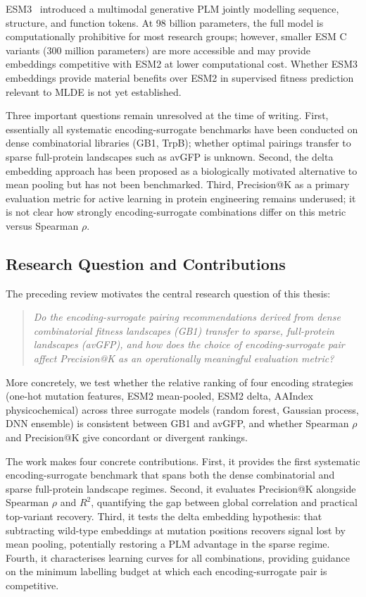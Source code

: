 \documentclass[english, 12pt, a4paper, elec, utf8, a-2b, online]{aaltothesis}
\begin{document}
ESM3~\cite{Hayes2025ESM3} introduced a multimodal generative PLM jointly modelling sequence,
structure, and function tokens.
At 98 billion parameters, the full model is computationally prohibitive for most research
groups; however, smaller ESM C variants (300 million parameters) are more accessible and may
provide embeddings competitive with ESM2 at lower computational cost.
Whether ESM3 embeddings provide material benefits over ESM2 in supervised fitness prediction
relevant to MLDE is not yet established.

Three important questions remain unresolved at the time of writing.
First, essentially all systematic encoding-surrogate benchmarks have been conducted on dense
combinatorial libraries (GB1, TrpB); whether optimal pairings transfer to sparse full-protein
landscapes such as avGFP is unknown.
Second, the delta embedding approach has been proposed as a biologically motivated alternative
to mean pooling but has not been benchmarked.
Third, Precision@K as a primary evaluation metric for active learning in protein engineering
remains underused; it is not clear how strongly encoding-surrogate combinations differ on
this metric versus Spearman $\rho$.

\subsection{Research Question and Contributions}
\label{sec:litrev:rq}

The preceding review motivates the central research question of this thesis:

\begin{quote}
  \emph{Do the encoding-surrogate pairing recommendations derived from dense combinatorial
  fitness landscapes (GB1) transfer to sparse, full-protein landscapes (avGFP),
  and how does the choice of encoding-surrogate pair affect Precision@K as an
  operationally meaningful evaluation metric?}
\end{quote}

More concretely, we test whether the relative ranking of four encoding strategies
(one-hot mutation features, ESM2 mean-pooled, ESM2 delta, AAIndex physicochemical)
across three surrogate models (random forest, Gaussian process, DNN ensemble) is consistent
between GB1 and avGFP, and whether Spearman $\rho$ and Precision@K give concordant or
divergent rankings.

The work makes four concrete contributions.
First, it provides the first systematic encoding-surrogate benchmark that spans both the
dense combinatorial and sparse full-protein landscape regimes.
Second, it evaluates Precision@K alongside Spearman $\rho$ and $R^2$, quantifying the
gap between global correlation and practical top-variant recovery.
Third, it tests the delta embedding hypothesis: that subtracting wild-type embeddings at
mutation positions recovers signal lost by mean pooling, potentially restoring a PLM advantage
in the sparse regime.
Fourth, it characterises learning curves for all combinations, providing guidance on the
minimum labelling budget at which each encoding-surrogate pair is competitive.
\end{document}
